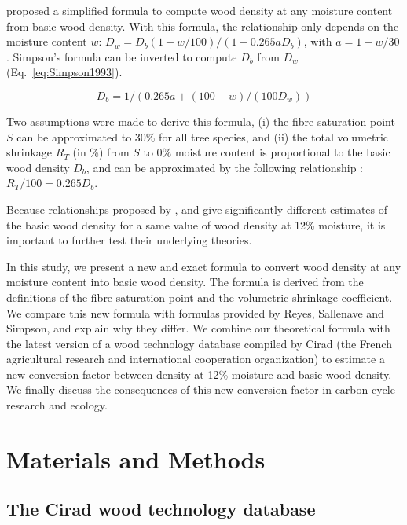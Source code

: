 \documentclass[a4paper, 12pt, leqno, dvipsnames]{article}\usepackage[]{graphicx}\usepackage[]{color}
\begin{document}
\citet{Simpson1993} proposed a simplified formula to compute wood density at any moisture content from basic wood density. With this formula, the relationship only depends on the moisture content $w$: $D_w=D_b(1+w/100)/(1-0.265aD_b)$, with $a=1-w/30$. Simpson's formula can be inverted to compute $D_b$ from $D_w$ (Eq.~\ref{eq:Simpson1993}).

\begin{equation}
  \label{eq:Simpson1993}
  D_b=1/(0.265a+(100+w)/(100D_w))
\end{equation}

Two assumptions were made to derive this formula, (i) the fibre saturation point $S$ can be approximated to 30\% for all tree species, and (ii) the total volumetric shrinkage $R_T$ (in \%) from $S$ to 0\% moisture content is proportional to the basic wood density $D_b$, and can be approximated by the following relationship \citep{Stamm1964}: $R_T/100=0.265 D_b$. 

Because relationships proposed by \citet{Reyes1992}, \citet{Sallenave1971} and \citet{Simpson1993} give significantly different estimates of the basic wood density for a same value of wood density at 12\% moisture, it is important to further test their underlying theories. 

In this study, we present a new and exact formula to convert wood density at any moisture content into basic wood density. The formula is derived from the definitions of the fibre saturation point and the volumetric shrinkage coefficient. We compare this new formula with formulas provided by Reyes, Sallenave and Simpson, and explain why they differ. We combine our theoretical formula with the latest version of a wood technology database compiled by Cirad (the French agricultural research and international cooperation organization) to estimate a new conversion factor between density at 12\% moisture and basic wood density. We finally discuss the consequences of this new conversion factor in carbon cycle research and ecology.

\newpage

\section{Materials and Methods}

\subsection{The Cirad wood technology database}
\end{document}
